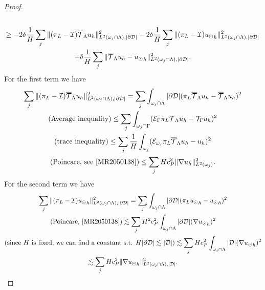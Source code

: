 \begin{proof}
\begin{multline*}
\\ 
\geq -2\delta \frac 1H \sum_j \|(\pi_L - \mathcal{I}){\overline{\mathcal{T}}_\Lambda} u_h\|^2_{L^2(\omega _j\cap \Lambda), |\partial\mathcal{D}|}
-2 \delta \frac 1H \sum_j \|(\pi_L - \mathcal{I}){u_{\odot}}_h\|^2_{L^2(\omega _j\cap \Lambda),|\partial\mathcal{D}|}
\\ 
+ \delta \frac 1H \sum_j \|{\overline{\mathcal{T}}_\Lambda} u_h-{u_{\odot}}_h\|^2_{L^2(\omega _j\cap \Lambda),|\partial\mathcal{D}|}. 
\end{multline*}
For the first term we have
\begin{multline*}
\sum _j  \|(\pi_L - \mathcal{I})\mtrace u_h\|^2_{L^2(\patch\cap \Lambda),|\DD|} =\sum _j \int _{\patch \cap \Lambda} |\DD| (\pi_L \mtrace u_h- \mtrace u_h)^2
\\
(\text{Average inequality)} \leq \sum _j  \int_{\omega _j \cap \Gamma} (\ext \pi_L \mtrace u_h -\trace u_h)^2 
\\
(\text{trace inequality}) \leq \sum _j  \frac 1H \int_{\omega_j}(\mathcal{E}_{\patch} \pi_L \mtrace u_h - u_h)^2 
\\ 
(\text{Poincare, see \cite[Corollary B.65]{MR2050138}})\leq \sum _j  H c_P ^2 \|\nabla u_h\|^2_{L^2(\omega _j)}.
\end{multline*}
For the second term we have
\begin{multline*}
\sum _j \|(\pi_L - \mathcal{I}){\ud}_h\|^2_{L^2(\patch\cap \Lambda),|\DD|} = \sum _j \int_{\patch\cap \Lambda} |\DD| (\pi_L {\ud}_h -{\ud}_h)^2
\\
(\text{Poincare, \cite[Corollary B.65]{MR2050138}})\lesssim \sum _j  H^2 c_P^2 \int_{\patch\cap \Lambda} |\DD|(\nabla {\ud}_h)^2
\\
(\text{since $H$ is fixed, we can find a constant s.t. } H|\DD| \lesssim |\D|) \lesssim \sum _j H c_P^2  \int_{\patch\cap \Lambda} |\D|(\nabla {\ud}_h)^2 
\\
\lesssim \sum _j H c_P^2  \|\nabla {\ud}_h\|^2_{L^2(\patch\cap \Lambda),|\D|}.
\end{multline*}

\end{proof}

